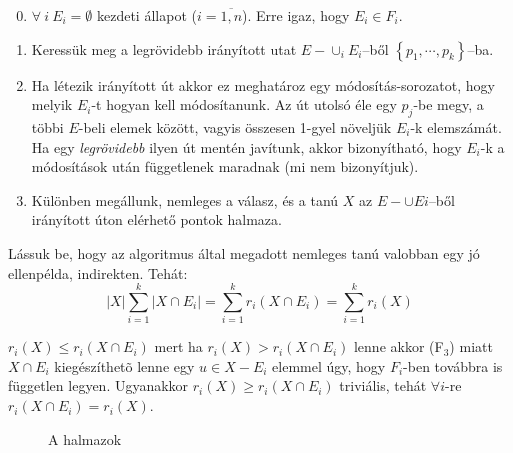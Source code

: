 \begin{enumerate}
    \setcounter{enumi}{-1}
    \item $\forall~i~E_i = \emptyset$ kezdeti állapot ($i=\overline{1,n}$). Erre
    igaz, hogy $E_i \in F_i$.
    \item Keressük meg a legrövidebb irányított utat $E-\cup_{i}E_i$--ből
    $\left\{ p_1, \cdots, p_k \right\}$--ba.
    
    \item Ha létezik irányított út akkor ez meghatároz egy módosítás-sorozatot,
    hogy melyik $E_i$-t hogyan kell módosítanunk. Az út utolsó éle egy $p_j$-be
    megy, a többi $E$-beli elemek között, vagyis összesen 1-gyel növeljük
    $E_i$-k elemszámát.  Ha egy {\it legrövidebb} ilyen út mentén javítunk,
    akkor bizonyítható, hogy $E_i$-k a módosítások után függetlenek maradnak (mi
    nem bizonyítjuk).
    \item Különben megállunk, nemleges a válasz, és a tanú $X$ az $E- \cup Ei$--ből
    irányított úton elérhető pontok halmaza.
\end{enumerate} 

Lássuk be, hogy az algoritmus által megadott nemleges tanú valobban egy jó
ellenpélda, indirekten. Tehát:
\[ 
|X| \sum_{i=1}^k |X \cap E_i| = \sum_{i=1}^k r_i(X \cap E_i) = \sum_{i=1}^k r_i(X) 
\]

$r_i(X) \leq r_i(X \cap E_i)$ mert ha $r_i(X) > r_i(X \cap E_i)$  lenne akkor
(F$_3$) miatt $X \cap E_i$ kiegészíthetõ lenne egy $u \in X - E_i$ elemmel úgy,
hogy $F_i$-ben továbbra is független legyen. Ugyanakkor $r_i(X) \geq r_i(X \cap
E_i)$ triviális, tehát $\forall i$-re $r_i(X \cap E_i) = r_i(X)$.

\begin{figure}[htbp]
\caption{A halmazok}
\label{fig:MPP_halm}
\centering {} 
\end{figure}

